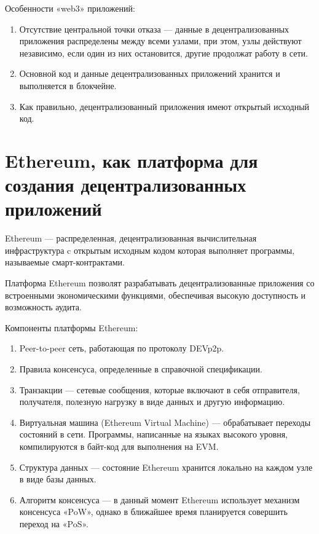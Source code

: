 Особенности «web3» приложений:

\begin{enumerate} 
  \item Отсутствие центральной точки отказа — данные в децентрализованных приложения распределены между всеми узлами, при этом, узлы действуют независимо, если один из них остановится, другие продолжат работу в сети.
  
  \item Основной код и данные децентрализованных приложений хранится и выполняется в блокчейне.
  
  \item Как правильно, децентрализованный приложения имеют открытый исходный код.
\end{enumerate}

\section{Ethereum, как платформа для создания децентрализованных приложений}

Ethereum — распределенная, децентрализованная вычислительная инфраструктура c открытым исходным кодом которая выполняет программы, называемые смарт-контрактами.

Платформа Ethereum позволят разрабатывать децентрализованные приложения со встроенными экономическими функциями, обеспечивая высокую доступность и возможность аудита.

Компоненты платформы Ethereum:

\begin{enumerate} 
  \item Peer-to-peer сеть, работающая по протоколу DEVp2p.
  
  \item Правила консенсуса, определенные в справочной спецификации.
  
  \item Транзакции — сетевые сообщения, которые включают в себя отправителя, получателя, полезную нагрузку в виде данных и другую информацию.
  
  \item Виртуальная машина (Ethereum Virtual Machine) — обрабатывает переходы состояний в сети. Программы, написанные на языках высокого уровня, компилируются в байт-код для выполнения на EVM.
  
  \item Структура данных — состояние Ethereum хранится локально на каждом узле в виде базы данных.
  
  \item Алгоритм консенсуса — в данный момент Ethereum использует механизм консенсуса «PoW», однако в ближайшее время планируется совершить переход на «PoS».
\end{enumerate}

